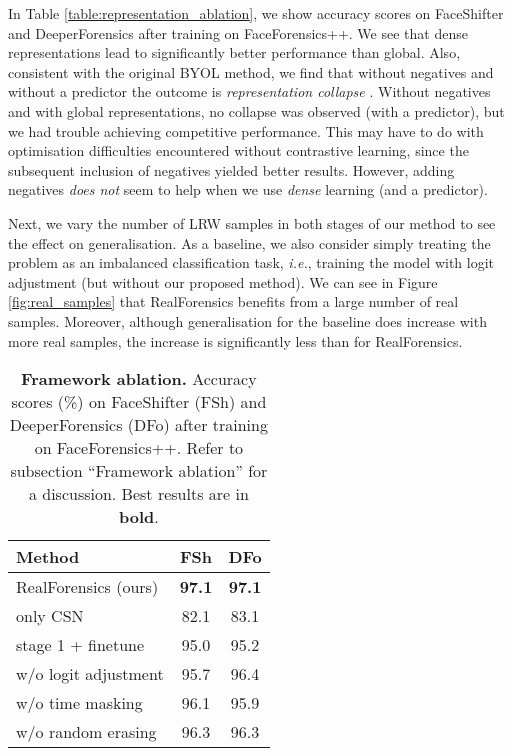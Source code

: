 \documentclass[10pt,twocolumn,letterpaper]{article}
\begin{document}
\begin{description}[wide,itemindent=\labelsep]
In Table \ref{table:representation_ablation}, we show accuracy scores on FaceShifter and DeeperForensics after training on FaceForensics++. We see that dense representations lead to significantly better performance than global. Also, consistent with the original BYOL method, we find that without negatives and without a predictor the outcome is \textit{representation collapse} \cite{grill2020bootstrap}. Without negatives and with global representations, no collapse was observed (with a predictor), but we had trouble achieving competitive performance. This may have to do with optimisation difficulties encountered without contrastive learning, since the subsequent inclusion of negatives yielded better results. However, adding negatives \textit{does not} seem to help when we use \textit{dense} learning (and a predictor).

\item[Effect of number of real samples.] Next, we vary the number of LRW samples in both stages of our method to see the effect on generalisation. As a baseline, we also consider simply treating the problem as an imbalanced classification task, \textit{i.e.}, training the model with logit adjustment (but without our proposed method). We can see in Figure \ref{fig:real_samples} that RealForensics benefits from a large number of real samples. Moreover, although generalisation for the baseline does increase with more real samples, the increase is significantly less than for RealForensics.

\begin{table}
\begin{center}
\begin{tabular}{l c c}\toprule
Method & FSh & DFo  \\ \midrule
RealForensics (ours) & \textbf{97.1} & \textbf{97.1} \\
\hspace{3mm} only CSN & 82.1 & 83.1 \\
\hspace{3mm} stage 1 + finetune & 95.0 & 95.2 \\
\hspace{3mm} w/o logit adjustment & 95.7 & 96.4 \\
\hspace{3mm} w/o time masking & 96.1 & 95.9 \\
\hspace{3mm} w/o random erasing & 96.3 & 96.3 \\
\bottomrule 
\end{tabular}
\end{center}
\caption{\textbf{Framework ablation.} Accuracy scores (\%) on FaceShifter (FSh) and DeeperForensics (DFo) after training on FaceForensics++. Refer to subsection ``Framework ablation'' for a discussion. Best results are in \textbf{bold}.}
\label{table:framework_ablation}
\end{table}


\end{description}
\end{document}

